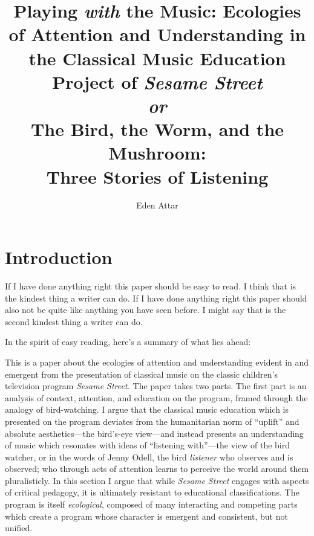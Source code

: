 \documentclass[12pt,letterpaper]{article}
\begin{document}
	
	\title{Playing \textit{with} the Music: Ecologies of Attention and 
	Understanding in the Classical Music Education Project of 
	\textit{Sesame Street}\\
	\vspace*{12pt}
	\large
	\textit{or}\\
	\vspace*{12pt}
	\Large
	The Bird, the Worm, and the Mushroom:\\ Three Stories of Listening}
	\author{Eden Attar}
	\maketitle
	\doublespacing
	\thispagestyle{empty}
	\newpage
	\clearpage
	\setcounter{page}{1}
	\thispagestyle{empty}
	\frenchspacing
	
	\section*{Introduction}	

	If I have done anything right this paper should be easy to read. I
	think that is the kindest thing a writer can do. If I have
	done anything right this paper should also not be quite like anything 
	you have seen before. I might say that is the second kindest thing a 
	writer can do.  

	In the spirit of easy reading, here's a summary of what lies ahead:

	This is a paper about the ecologies of attention and understanding 
	evident in and emergent from the presentation of classical music on the
	classic children's television program \textit{Sesame Street.}  
	The paper takes two parts. The first part is an analysis of context,
	attention, and education on the program, framed through the analogy of
	bird-watching. I argue that the classical music education which is 
	presented on the program deviates from the humanitarian norm of 
	``uplift'' and absolute aesthetics---the bird's-eye view---and instead
	presents an understanding of music which resonates with ideas of 
	``listening with''---the view of the bird watcher, or in the words of
	Jenny Odell, the bird \textit{listener} who observes and is observed;
	who through acts of attention learns to perceive the world around them
	pluralisticly. In this section I argue that while \textit{Sesame
	Street} engages with aspects of critical pedagogy, it is ultimately 
	resistant to educational classifications. The program is itself
	\textit{ecological}, composed of many interacting and competing parts
	which create a program whose character is emergent and consistent, but
	not unified.   
\end{document}
